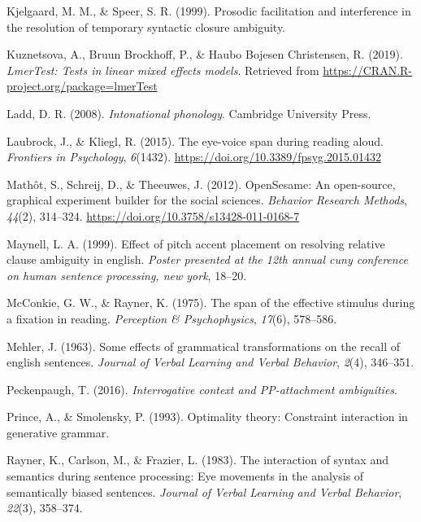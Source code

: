 \documentclass[12pt,oneside]{book}
\begin{document}
\leavevmode\hypertarget{ref-Kjelgaard1999-xd}{}%
Kjelgaard, M. M., \& Speer, S. R. (1999). Prosodic facilitation and interference in the resolution of temporary syntactic closure ambiguity.

\leavevmode\hypertarget{ref-R-lmerTest}{}%
Kuznetsova, A., Bruun Brockhoff, P., \& Haubo Bojesen Christensen, R. (2019). \emph{LmerTest: Tests in linear mixed effects models}. Retrieved from \url{https://CRAN.R-project.org/package=lmerTest}

\leavevmode\hypertarget{ref-ladd}{}%
Ladd, D. R. (2008). \emph{Intonational phonology}. Cambridge University Press.

\leavevmode\hypertarget{ref-evs}{}%
Laubrock, J., \& Kliegl, R. (2015). The eye-voice span during reading aloud. \emph{Frontiers in Psychology}, \emph{6}(1432). \url{https://doi.org/10.3389/fpsyg.2015.01432}

\leavevmode\hypertarget{ref-os2012}{}%
Mathôt, S., Schreij, D., \& Theeuwes, J. (2012). OpenSesame: An open-source, graphical experiment builder for the social sciences. \emph{Behavior Research Methods}, \emph{44}(2), 314--324. \url{https://doi.org/10.3758/s13428-011-0168-7}

\leavevmode\hypertarget{ref-maynell1999effect}{}%
Maynell, L. A. (1999). Effect of pitch accent placement on resolving relative clause ambiguity in english. \emph{Poster presented at the 12th annual cuny conference on human sentence processing, new york}, 18--20.

\leavevmode\hypertarget{ref-spanmcr}{}%
McConkie, G. W., \& Rayner, K. (1975). The span of the effective stimulus during a fixation in reading. \emph{Perception \& Psychophysics}, \emph{17}(6), 578--586.

\leavevmode\hypertarget{ref-mehler1963some}{}%
Mehler, J. (1963). Some effects of grammatical transformations on the recall of english sentences. \emph{Journal of Verbal Learning and Verbal Behavior}, \emph{2}(4), 346--351.

\leavevmode\hypertarget{ref-qp2}{}%
Peckenpaugh, T. (2016). \emph{Interrogative context and PP-attachment ambiguities}.

\leavevmode\hypertarget{ref-Prince1993-ic}{}%
Prince, A., \& Smolensky, P. (1993). Optimality theory: Constraint interaction in generative grammar.

\leavevmode\hypertarget{ref-raynerEtAl1983}{}%
Rayner, K., Carlson, M., \& Frazier, L. (1983). The interaction of syntax and semantics during sentence processing: Eye movements in the analysis of semantically biased sentences. \emph{Journal of Verbal Learning and Verbal Behavior}, \emph{22}(3), 358--374.
\end{document}
